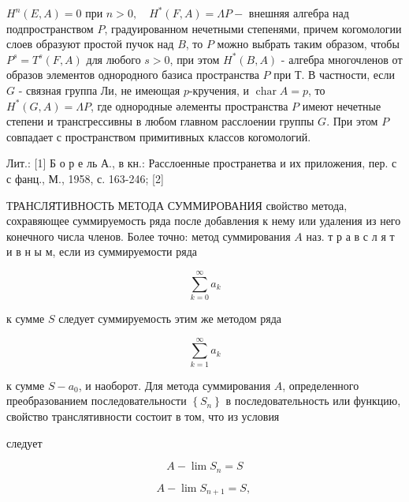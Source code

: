 \documentclass[10pt]{article}
\begin{document}
$H^{n}(E, A)=0$ при $n>0, \quad H^{*}(F, A)=\Lambda P-$ внешняя алгебра над подпространством $P$, градуированном нечетными степенями, причем когомологии слоев образуют простой пучок над $B$, то $P$ можно выбрать таким образом, чтобы $P^{s}=T^{s}(F, A)$ для любого $s>0$, при этом $H^{*}(B, A)$ - алгебра многочленов от образов элементов однородного базиса пространства $P$ при Т. В частности, если $G$ - связная группа Ли, не имеющая $p$-кручения, и $\operatorname{char} A=p$, то $H^{*}(G, A)=\Lambda P$, где однородные әлементы пространства $P$ имеют нечетные степени и трансгрессивны в любом главном расслоении группы $G$. При этом $P$ совпадает с пространством примитивных классов когомологий.



Лит.: [1] Б о р е ль А., в кн.: Расслоенные пространетва и их приложения, пер. с с фанц., М., 1958, с. 163-246; [2]



ТРАНСЛЯ̈ТИВНОСТЬ МЕТОДА СУММИРОВАНИЯ свойство метода, сохравяющее суммируемость ряда после добавления к нему или удаления из него конечного числа членов. Более точно: метод суммирования $A$ наз. т р а в с л я т и в н ы м, если из суммируемости ряда



\[

\sum_{k=0}^{\infty} a_{k}

\]



к сумме $S$ следует суммируемость этим же методом ряда



\[

\sum_{k=1}^{\infty} a_{k}

\]



к сумме $S-a_{0}$, и наоборот. Для метода суммирования $A$, определенного преобразованием последовательности $\left\{S_{n}\right\}$ в последовательность или функцию, свойство транслятивности состоит в том, что из условия



следует



\[

A-\lim S_{n}=S

\]



\[

A-\lim S_{n+1}=S \text {, }

\]
\end{document}
